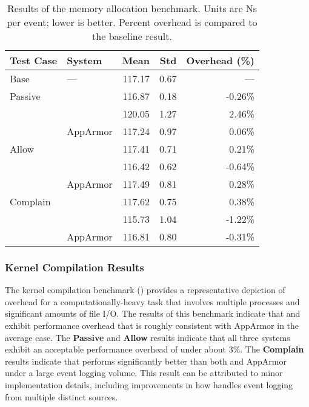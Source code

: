 \begingroup\small
\begin{longtable}[c]{llrrr}
  \caption[Results of the memory allocation benchmark]{
    Results of the memory allocation benchmark. Units are Ns per event; lower is
    better. Percent overhead is compared to the baseline result.
  }%
  \label{tab:phoronix-memory}\\
  \toprule
   Test Case & System         &  Mean  & Std  & Overhead (\%)\\
   \midrule
   Base      & ---            & 117.17 & 0.67 & ---     \\
   \midrule
   Passive   & \bpfbox{}      & 116.87 & 0.18 & -0.26\% \\
             & \bpfcontain{}  & 120.05 & 1.27 &  2.46\% \\
             & AppArmor       & 117.24 & 0.97 &  0.06\% \\
   \midrule
   Allow     & \bpfbox{}      & 117.41 & 0.71 &  0.21\% \\
             & \bpfcontain{}  & 116.42 & 0.62 & -0.64\% \\
             & AppArmor       & 117.49 & 0.81 &  0.28\% \\
   \midrule
   Complain  & \bpfbox{}      & 117.62 & 0.75 &  0.38\% \\
             & \bpfcontain{}  & 115.73 & 1.04 & -1.22\% \\
             & AppArmor       & 116.81 & 0.80 & -0.31\% \\
  \bottomrule
\end{longtable}
\endgroup


\subsubsection{Kernel Compilation Results}

The kernel compilation benchmark () provides a representative
depiction of overhead for a computationally-heavy task that involves multiple processes
and significant amounts of file I/O. The results of this benchmark indicate that \bpfbox{}
and \bpfcontain{} exhibit performance overhead that is roughly consistent with AppArmor in
the average case. The \textbf{Passive} and \textbf{Allow} results indicate that all three
systems exhibit an acceptable performance overhead of under about $3\%$. The
\textbf{Complain} results indicate that \bpfcontain{} performs significantly better than
both \bpfbox{} and AppArmor under a large event logging volume. This result can be
attributed to minor implementation details, including improvements in how \bpfcontain{}
handles event logging from multiple distinct sources.


